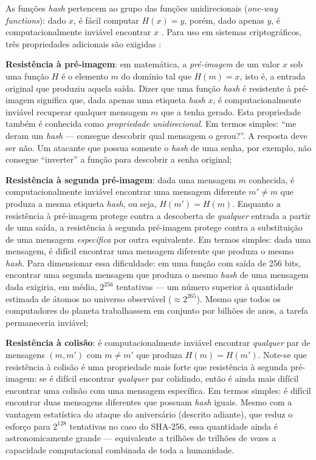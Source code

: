 As funções \textit{hash} pertencem ao grupo das funções unidirecionais (\textit{one-way functions}): dado $x$, é fácil computar $H(x) = y$, porém, dado apenas $y$, é computacionalmente inviável encontrar $x$ \cite{tomaz2014}. Para uso em sistemas criptográficos, três propriedades adicionais são exigidas \cite{tomaz2014}:

\begin{alineas}
    \item \textbf{Resistência à pré-imagem}: em matemática, a \textit{pré-imagem} de um valor $x$ sob uma função $H$ é o elemento $m$ do domínio tal que $H(m) = x$, isto é, a entrada original que produziu aquela saída. Dizer que uma função \textit{hash} é resistente à pré-imagem significa que, dada apenas uma etiqueta \textit{hash} $x$, é computacionalmente inviável recuperar qualquer mensagem $m$ que a tenha gerado. Esta propriedade também é conhecida como \textit{propriedade unidirecional}. Em termos simples: ``me deram um \textit{hash} --- consegue descobrir qual mensagem o gerou?''. A resposta deve ser não. Um atacante que possua somente o \textit{hash} de uma senha, por exemplo, não consegue ``inverter'' a função para descobrir a senha original;
    \item \textbf{Resistência à segunda pré-imagem}: dada uma mensagem $m$ conhecida, é computacionalmente inviável encontrar uma mensagem diferente $m' \neq m$ que produza a mesma etiqueta \textit{hash}, ou seja, $H(m') = H(m)$. Enquanto a resistência à pré-imagem protege contra a descoberta de \textit{qualquer} entrada a partir de uma saída, a resistência à segunda pré-imagem protege contra a substituição de uma mensagem \textit{específica} por outra equivalente. Em termos simples: dada uma mensagem, é difícil encontrar uma mensagem diferente que produza o mesmo \textit{hash}. Para dimensionar essa dificuldade: em uma função com saída de 256 bits, encontrar uma segunda mensagem que produza o mesmo \textit{hash} de uma mensagem dada exigiria, em média, $2^{256}$ tentativas --- um número superior à quantidade estimada de átomos no universo observável ($\approx 2^{265}$). Mesmo que todos os computadores do planeta trabalhassem em conjunto por bilhões de anos, a tarefa permaneceria inviável;
    \item \textbf{Resistência à colisão}: é computacionalmente inviável encontrar \textit{qualquer} par de mensagens $(m, m')$ com $m \neq m'$ que produza $H(m) = H(m')$. Note-se que resistência à colisão é uma propriedade mais forte que resistência à segunda pré-imagem: se é difícil encontrar \textit{qualquer} par colidindo, então é ainda mais difícil encontrar uma colisão com uma mensagem específica. Em termos simples: é difícil encontrar duas mensagens diferentes que possuam \textit{hash} iguais. Mesmo com a vantagem estatística do ataque do aniversário (descrito adiante), que reduz o esforço para $2^{128}$ tentativas no caso do SHA-256, essa quantidade ainda é astronomicamente grande --- equivalente a trilhões de trilhões de vezes a capacidade computacional combinada de toda a humanidade.
\end{alineas}

